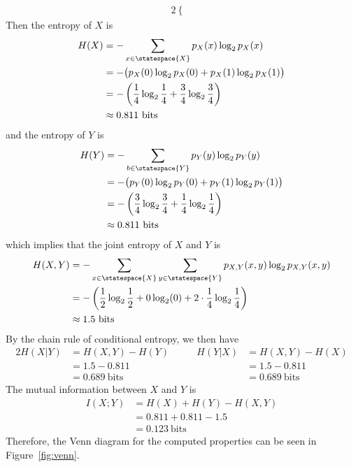 \documentclass[
  coursecode={MTHE 474},
  assignmentname={Homework \homeworknumber},
  studentnumber=20053722,
  name={Bryan Hoang}
]{
  ltxanswer%
}
\begin{document}
\begin{questions}
\begin{solution}
\begin{alignat*}{2}
\begin{cases}
                                                  \end{cases}
      \end{alignat*}
      Then the entropy of \(X\) is
      \begin{align*}
        H(X) &= -\sum_{x\in\statespace{X}} p_{X}(x) \log_{2} p_{X}(x)                         \\
             &= -\big(p_{X}(0)\log_{2}p_{X}(0) + p_{X}(1)\log_{2}p_{X}(1)\big)                \\
             &= -\left(\frac{1}{4}\log_{2}\frac{1}{4} + \frac{3}{4}\log_{2}\frac{3}{4}\right) \\
             &\approx 0.811\ \text{bits}
      \end{align*}
      and the entropy of \(Y\) is
      \begin{align*}
        H(Y) &= -\sum_{b\in\statespace{Y}} p_{Y}(y) \log_{2} p_{Y}(y)                         \\
             &= -\big(p_{Y}(0)\log_{2}p_{Y}(0) + p_{Y}(1)\log_{2}p_{Y}(1)\big)                \\
             &= -\left(\frac{3}{4}\log_{2}\frac{3}{4} + \frac{1}{4}\log_{2}\frac{1}{4}\right) \\
             &\approx 0.811\ \text{bits}
      \end{align*}
      which implies that the joint entropy of \(X\) and \(Y\) is
      \begin{align*}
        H(X,Y) &= -\sum_{x\in\statespace{X}}\sum_{y\in\statespace{Y}} p_{X,Y}(x,y) \log_{2}p_{X,Y}(x,y)               \\
               &= -\left(\frac{1}{2}\log_{2}\frac{1}{2} + 0\log_{2}(0) + 2\cdot \frac{1}{4}\log_{2}\frac{1}{4}\right) \\
               &\approx 1.5\ \text{bits}
      \end{align*}
      By the chain rule of conditional entropy, we then have
      \begin{alignat*}{2}
        H(X|Y) &= H(X,Y) - H(Y)      &\qquad H(Y|X) &= H(X,Y) - H(X)      \\
               &= 1.5 - 0.811        &              &= 1.5 - 0.811        \\
               &= 0.689\ \text{bits} &              &= 0.689\ \text{bits}
      \end{alignat*}
      The mutual information between \(X\) and \(Y\) is
      \begin{align*}
        I(X;Y) &= H(X) + H(Y) - H(X,Y) \\
               &= 0.811 + 0.811 - 1.5  \\
               &= 0.123\ \text{bits}
      \end{align*}
      Therefore, the Venn diagram for the computed properties can be seen in Figure~\ref{fig:venn}.
      \begin{answerfigure}
\end{answerfigure}
\end{solution}
\end{questions}
\end{document}
